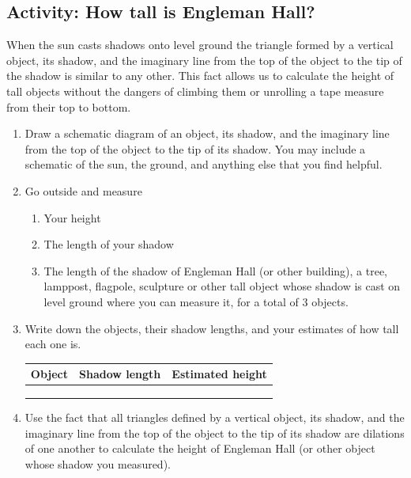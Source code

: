 \wbnewpage
\subsection{Activity: How tall is Engleman Hall?}
When the sun casts shadows onto level ground the triangle formed by a vertical object, its shadow, and the imaginary line from the top of the object to the tip of the shadow is similar to any other. This fact allows us to calculate the height of tall objects without the dangers of climbing them or unrolling a tape measure from their top to bottom.
\begin{enumerate}
    \item Draw a schematic diagram of an object, its shadow, and the imaginary line from the top of the object to the tip of its shadow. You may include a schematic of the sun, the ground, and anything else that you find helpful.\wbvfill\wbvfill
    \item Go outside and measure 
    \begin{enumerate}
        \item Your height\medskip
        \item The length of your shadow\medskip
        \item The length of the shadow of Engleman Hall (or other building), a tree, lamppost, flagpole, sculpture or other tall object whose shadow is cast on level ground where you can measure it, for a total of 3 objects.
    \end{enumerate}
    \item Write down the objects, their shadow lengths, and your estimates of how tall each one is.
    \par\smallskip\noindent\setlength{\extrarowheight}{15pt}
    \begin{tabular}{|>{\raggedright}p{2in}|>{\raggedright}p{1.5in}|>{\raggedright}p{1.5in}|}
        \hline 
            Object & Shadow length & Estimated height\tabularnewline
        \hline 
            &  & \tabularnewline
        \hline 
            &  & \tabularnewline
        \hline 
            &  & \tabularnewline
        \hline 
    \end{tabular}
    \setlength{\extrarowheight}{0pt}
    \wbnewpage
    \item Use the fact that all triangles defined by a vertical object, its shadow, and the imaginary line from the top of the object to the tip of its shadow are dilations of one another to calculate the height of Engleman Hall (or other object whose shadow you measured).
\end{enumerate}

